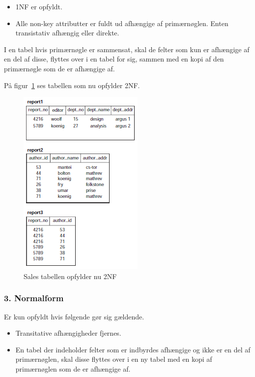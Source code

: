 	
\begin{itemize}
	\item 1NF er opfyldt.
	\item Alle non-key attributter er fuldt ud afhængige af primærnøglen. Enten transistativ afhængig eller direkte.
\end{itemize}
	
I en tabel hvis primærnøgle er sammensat, skal de felter som kun er afhængige af en del af disse, flyttes over i en tabel for sig, sammen med en kopi af den primærnøgle som de er afhængige af.

På figur~\ref{fig:2NF} ses tabellen som nu opfylder 2NF. 

\begin{figure}[H]
	\centering
	\includegraphics[width=0.5\linewidth]{figs/spm5/2NF.PNG}
	\caption{Sales tabellen opfylder nu 2NF}
	\label{fig:2NF}
\end{figure}
	
\subsubsection{3. Normalform} 
Er kun opfyldt hvis følgende gør sig gældende.

\begin{itemize}
	\item Transitative afhængigheder fjernes.
	\item En tabel der indeholder felter som er indbyrdes afhængige og ikke er en del af primærnøglen, skal disse flyttes over i en ny tabel med en kopi af primærnøglen som de er afhængige af.
\end{itemize}
	
